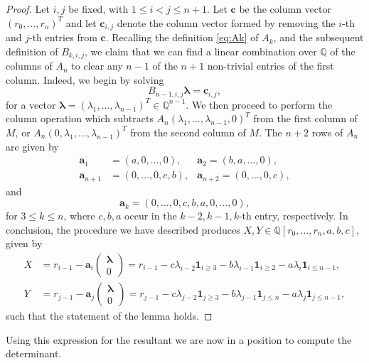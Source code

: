 \documentclass[reqno, 12pt, twoside]{amsart}
\numberwithin{equation}{section}
\newcommand{\Q}{\mathbb{Q}}
\newcommand{\0}{\mathbf{0}}
\theoremstyle{definition}
\renewcommand{\leq}{\leqslant}
\renewcommand{\geq}{\geqslant}
\begin{document}
\begin{proof}
Let $i,j$ be fixed, with  $1\leq i<j\leq n+1$.
Let $\mathbf{c}$ be the column vector $(r_0,\dots, r_n)^T$
and 
let $\mathbf{c}_{i,j}$ denote the column vector formed by removing the $i$-th and  $j$-th entries from $\mathbf{c}$. 
 Recalling the definition \eqref{eq:Ak} of $A_k$, and the subsequent definition of 
 $B_{k,i,j}$, 
we claim that we  can find a linear combination over $\Q$ of the  columns of $A_n$ to 
clear any $n-1$ of the $n+1$ non-trivial entries of the first column. 
Indeed, we begin by solving 
\[B_{n-1,i,j}\boldsymbol{\lambda}=\mathbf{c}_{i,j},\]
for a vector $\boldsymbol{\lambda}=(\lambda_1,\dots,\lambda_{n-1})^T\in\Q^{n-1}$.
We then proceed to perform  the column operation which subtracts $A_n
(\lambda_1,\dots,\lambda_{n-1},0)^T$
from the first column of $M$, or 
$A_n
(0,\lambda_1,\dots,\lambda_{n-1})^T$ from the second
	column of $M$.
The $n+2$ rows of $A_n$ are given by 
\begin{align*}
\mathbf{a}_1&=(a,0,\dots,0),  &\mathbf{a}_2=(b,a,\dots,0),\\
\mathbf{a}_{n+1}&=(0,\dots ,0,c,b),
&\mathbf{a}_{n+2}=(0,\dots ,0,c), 
\end{align*}
and 
$$
\mathbf{a}_{k}=(0,\dots,0,c,b,a,0,\dots,0), 
$$
for $3\leq k\leq n$, where $c,b,a$ occur in the $k-2,k-1,k$-th entry, respectively.
In conclusion, the procedure we have described produces $X,Y\in\Q[r_0,\dots, r_n,a,b,c]$, given by
\begin{align*}
X&=r_{i-1}-\mathbf{a}_{i}\begin{pmatrix}\boldsymbol{\lambda}\\ 0\end{pmatrix}
=r_{i-1}-c\lambda_{i-2}\mathbf{1}_{i\geq 3}-b\lambda_{i-1}\mathbf{1}_{i\geq 2}-a\lambda_{i}\mathbf{1}_{i\leq n-1},\\
Y&=r_{j-1}-\mathbf{a}_{j}\begin{pmatrix}\boldsymbol{\lambda}\\ 0\end{pmatrix}=r_{j-1}-c\lambda_{j-2}\mathbf{1}_{j\geq 3}-b\lambda_{j-1}\mathbf{1}_{j\leq n}
-a\lambda_j\mathbf{1}_{j\leq n-1},
\end{align*}
 such that the statement of the lemma holds. 
\end{proof}


Using this expression for the resultant  we are now in a position to compute the determinant.
\end{document}
